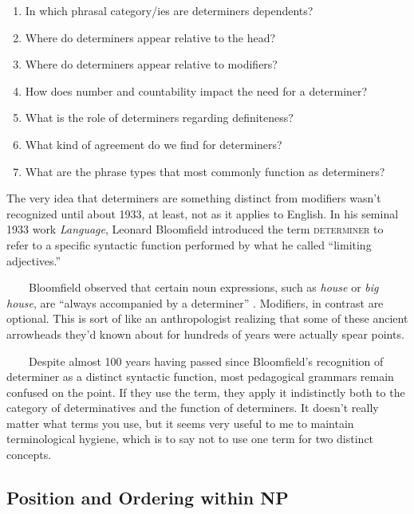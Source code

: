 \begin{enumerate}[noitemsep]
    \item In which phrasal category/ies are determiners dependents?
    \item Where do determiners appear relative to the head?
    \item Where do determiners appear relative to modifiers?
    \item How does number and countability impact the need for a determiner?
    \item What is the role of determiners regarding definiteness?
    \item What kind of agreement do we find for determiners?
    \item What are the phrase types that most commonly function as determiners?
\end{enumerate}

\begin{tcolorbox}[title=Determiners: A brief history, colback=white]

The very idea that determiners are something distinct from modifiers wasn't recognized until about 1933, at least, not as it applies to English. In his seminal 1933 work \textit{Language}, Leonard Bloomfield introduced the term \textsc{determiner} to refer to a specific syntactic function performed by what he called ``limiting adjectives.''

~~~~Bloomfield observed that certain noun expressions, such as \textit{house} or \textit{big house}, are ``always accompanied by a determiner'' \citep[203]{bloomfield1984language}. Modifiers, in contrast are optional. This is sort of like an anthropologist realizing that some of these ancient arrowheads they'd known about for hundreds of years were actually spear points.

~~~~Despite almost 100 years having passed since Bloomfield's recognition of determiner as a distinct syntactic function, most pedagogical grammars remain confused on the point. If they use the term, they apply it indistinctly both to the category of determinatives and the function of determiners. It doesn't really matter what terms you use, but it seems very useful to me to maintain terminological hygiene, which is to say not to use one term for two distinct concepts.

\end{tcolorbox}

\subsection{Position and Ordering within NP}

